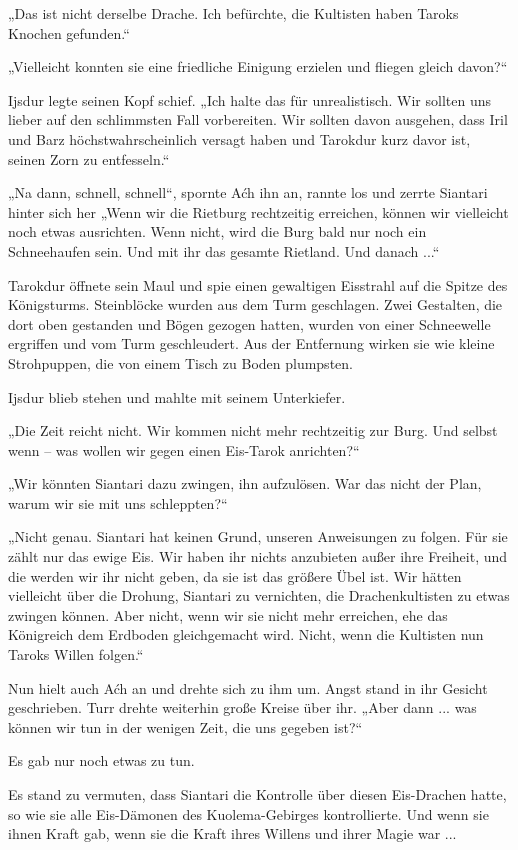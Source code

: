 „Das ist nicht derselbe Drache. Ich befürchte, die Kultisten haben Taroks Knochen gefunden.“

„Vielleicht konnten sie eine friedliche Einigung erzielen und fliegen gleich davon?“

Ijsdur legte seinen Kopf schief. „Ich halte das für unrealistisch. Wir sollten uns lieber auf den schlimmsten Fall vorbereiten. Wir sollten davon ausgehen, dass Iril und Barz höchstwahrscheinlich versagt haben und Tarokdur kurz davor ist, seinen Zorn zu entfesseln.“

„Na dann, schnell, schnell“, spornte Aćh ihn an, rannte los und zerrte Siantari hinter sich her „Wenn wir die Rietburg rechtzeitig erreichen, können wir vielleicht noch etwas ausrichten. Wenn nicht, wird die Burg bald nur noch ein Schneehaufen sein. Und mit ihr das gesamte Rietland. Und danach ...“

Tarokdur öffnete sein Maul und spie einen gewaltigen Eisstrahl auf die Spitze des Königsturms. Steinblöcke wurden aus dem Turm geschlagen. Zwei Gestalten, die dort oben gestanden und Bögen gezogen hatten, wurden von einer Schneewelle ergriffen und vom Turm geschleudert. Aus der Entfernung wirken sie wie kleine Strohpuppen, die von einem Tisch zu Boden plumpsten.

Ijsdur blieb stehen und mahlte mit seinem Unterkiefer.

„Die Zeit reicht nicht. Wir kommen nicht mehr rechtzeitig zur Burg. Und selbst wenn – was wollen wir gegen einen Eis-Tarok anrichten?“

„Wir könnten Siantari dazu zwingen, ihn aufzulösen. War das nicht der Plan, warum wir sie mit uns schleppten?“

„Nicht genau. Siantari hat keinen Grund, unseren Anweisungen zu folgen. Für sie zählt nur das ewige Eis. Wir haben ihr nichts anzubieten außer ihre Freiheit, und die werden wir ihr nicht geben, da sie ist das größere Übel ist. Wir hätten vielleicht über die Drohung, Siantari zu vernichten, die Drachenkultisten zu etwas zwingen können. Aber nicht, wenn wir sie nicht mehr erreichen, ehe das Königreich dem Erdboden gleichgemacht wird. Nicht, wenn die Kultisten nun Taroks Willen folgen.“

Nun hielt auch Aćh an und drehte sich zu ihm um. Angst stand in ihr Gesicht geschrieben. Turr drehte weiterhin große Kreise über ihr. „Aber dann ... was können wir tun in der wenigen Zeit, die uns gegeben ist?“

Es gab nur noch etwas zu tun.

Es stand zu vermuten, dass Siantari die Kontrolle über diesen Eis-Drachen hatte, so wie sie alle Eis-Dämonen des Kuolema-Gebirges kontrollierte. Und wenn sie ihnen Kraft gab, wenn sie die Kraft ihres Willens und ihrer Magie war ...


